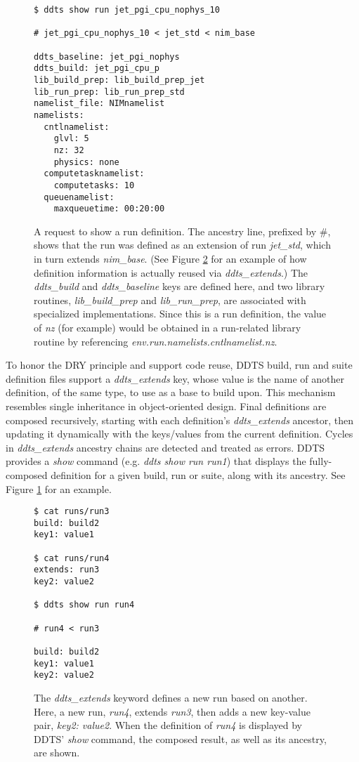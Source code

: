 \documentclass[conference]{IEEEtran}
\begin{document}
\begin{figure}[!t]
{\small \begin{verbatim}
$ ddts show run jet_pgi_cpu_nophys_10

# jet_pgi_cpu_nophys_10 < jet_std < nim_base

ddts_baseline: jet_pgi_nophys
ddts_build: jet_pgi_cpu_p
lib_build_prep: lib_build_prep_jet
lib_run_prep: lib_run_prep_std
namelist_file: NIMnamelist
namelists:
  cntlnamelist:
    glvl: 5
    nz: 32
    physics: none
  computetasknamelist:
    computetasks: 10
  queuenamelist:
    maxqueuetime: 00:20:00
\end{verbatim} }
\caption{A request to show a run definition. The ancestry line, prefixed by \#, shows that the run was defined as an extension of run \emph{jet\_std}, which in turn extends \emph{nim\_base}. (See Figure \ref{figure:4} for an example of how definition information is actually reused via \emph{ddts\_extends}.) The \emph{ddts\_build} and  \emph{ddts\_baseline} keys are defined here, and two library routines, \emph{lib\_build\_prep} and \emph{lib\_run\_prep}, are associated with specialized implementations. Since this is a run definition, the value of \emph{nz} (for example) would be obtained in a run-related library routine by referencing \emph{env.run.namelists.cntlnamelist.nz}.}
\label{figure:3}
\end{figure}

To honor the DRY principle and support code reuse, DDTS build, run and suite definition files support a \emph{ddts\_extends} key, whose value is the name of another definition, of the same type, to use as a base to build upon. This mechanism resembles single inheritance in object-oriented design. Final definitions are composed recursively, starting with each definition's \emph{ddts\_extends} ancestor, then updating it dynamically with the keys/values from the current definition. Cycles in \emph{ddts\_extends} ancestry chains are detected and treated as errors. DDTS provides a \emph{show} command (e.g. \emph{ddts show run run1}) that displays the fully-composed definition for a given build, run or suite, along with its ancestry. See Figure \ref{figure:3} for an example.

\begin{figure}[!t]
{\small \begin{verbatim}
$ cat runs/run3
build: build2
key1: value1

$ cat runs/run4
extends: run3
key2: value2

$ ddts show run run4

# run4 < run3

build: build2
key1: value1
key2: value2
\end{verbatim} }
\caption{The \emph{ddts\_extends} keyword defines a new run based on another. Here, a new run, \emph{run4}, extends \emph{run3}, then adds a new key-value pair, \emph{key2: value2}. When the definition of \emph{run4} is displayed by DDTS' \emph{show} command, the composed result, as well as its ancestry, are shown.}
\label{figure:4}
\end{figure}
\end{document}
